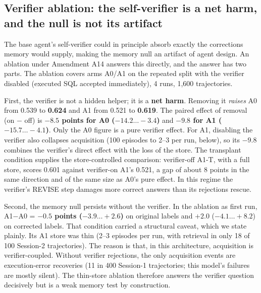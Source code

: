\documentclass[sigconf, nonacm]{acmart}
\begin{document}
\subsection{Verifier ablation: the self-verifier is a net harm, and the null is not its artifact}

The base agent's self-verifier could in principle absorb exactly the corrections memory would supply, making the memory null an artifact of agent design. An ablation under Amendment A14 answers this directly, and the answer has two parts. The ablation covers arms A0/A1 on the repeated split with the verifier disabled (executed SQL accepted immediately), 4 runs, 1,600 trajectories.

First, the verifier is not a hidden helper; it is a \textbf{net harm}. Removing it \emph{raises} A0 from 0.539 to \textbf{0.624} and A1 from 0.521 to \textbf{0.619}. The paired effect of removal (on $-$ off) is \textbf{$-8.5$ points for A0 ($-14.2\ldots-3.4$)} and \textbf{$-9.8$ for A1 ($-15.7\ldots-4.1$)}. Only the A0 figure is a pure verifier effect. For A1, disabling the verifier also collapses acquisition (100 episodes to 2--3 per run, below), so its $-9.8$ combines the verifier's direct effect with the loss of the store. The transplant condition supplies the store-controlled comparison: verifier-off A1-T, with a full store, scores 0.601 against verifier-on A1's 0.521, a gap of about 8 points in the same direction and of the same size as A0's pure effect. In this regime the verifier's REVISE step damages more correct answers than its rejections rescue.

Second, the memory null persists without the verifier. In the ablation as first run, A1$-$A0 = \textbf{$-0.5$ points ($-3.9\ldots+2.6$)} on original labels and $+2.0$ ($-4.1\ldots+8.2$) on corrected labels. That condition carried a structural caveat, which we state plainly. Its A1 store was thin (2--3 episodes per run, with retrieval in only 18 of 100 Session-2 trajectories). The reason is that, in this architecture, acquisition is verifier-coupled. Without verifier rejections, the only acquisition events are execution-error recoveries (11 in 400 Session-1 trajectories; this model's failures are mostly silent). The thin-store ablation therefore answers the verifier question decisively but is a weak memory test by construction.
\end{document}
